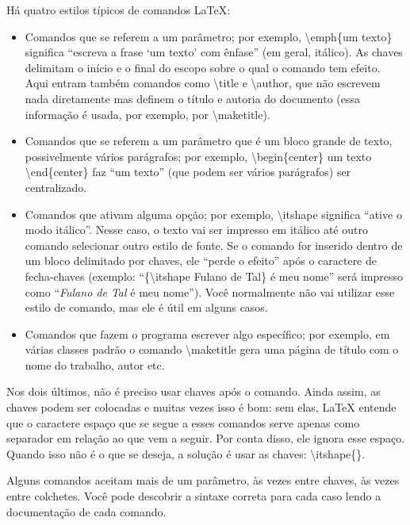 Há quatro estilos típicos de comandos \LaTeX{}:

\begin{itemize}
\item Comandos que se referem a um parâmetro; por exemplo,
\textsf{\textbackslash{}emph\{um texto\}} significa ``escreva a frase
`um texto' com ênfase'' (em geral, itálico). As chaves delimitam o início
e o final do escopo sobre o qual o comando tem efeito. Aqui entram também
comandos como \textsf{\textbackslash{}title} e \textsf{\textbackslash{}author},
que não escrevem nada diretamente mas definem o título e autoria do documento
(essa informação é usada, por exemplo, por \textsf{\textbackslash{}maketitle}).

\item Comandos que se referem a um parâmetro que é um bloco grande de
texto, possivelmente vários parágrafos; por exemplo,
\textsf{\textbackslash{}begin\{center\} um texto
\textbackslash{}end\{center\}} faz ``um texto'' (que podem ser
vários parágrafos) ser centralizado.

\item Comandos que ativam alguma opção; por exemplo,
\textsf{\textbackslash{}itshape} significa ``ative o modo itálico''.
Nesse caso, o texto vai ser impresso em itálico até outro comando selecionar
outro estilo de fonte. Se o comando for inserido dentro de um bloco
delimitado por chaves, ele ``perde o efeito'' após o caractere de fecha-chaves
(exemplo: ``\textsf{\{\textbackslash{}itshape Fulano de Tal\} é meu nome}''
será impresso como ``\textit{Fulano de Tal} é meu nome''). Você normalmente
não vai utilizar esse estilo de comando, mas ele é útil em alguns casos.

\item Comandos que fazem o programa escrever algo específico; por exemplo,
em várias classes padrão o comando \textsf{\textbackslash{}maketitle} gera
uma página de título com o nome do trabalho, autor etc.
\end{itemize}

Nos dois últimos, não é preciso usar chaves após o comando. Ainda assim, as
chaves podem ser colocadas e muitas vezes isso é bom: sem elas, \LaTeX{}
entende que o caractere espaço que se segue a esses comandos serve apenas
como separador em relação ao que vem a seguir. Por conta disso, ele ignora
esse espaço. Quando isso não é o que se deseja, a solução é usar as chaves:
\textsf{\textbackslash{}itshape\{\}}.

Alguns comandos aceitam mais de um parâmetro, às vezes entre chaves, às
vezes entre colchetes. Você pode descobrir a sintaxe correta para cada caso
lendo a documentação de cada comando.

